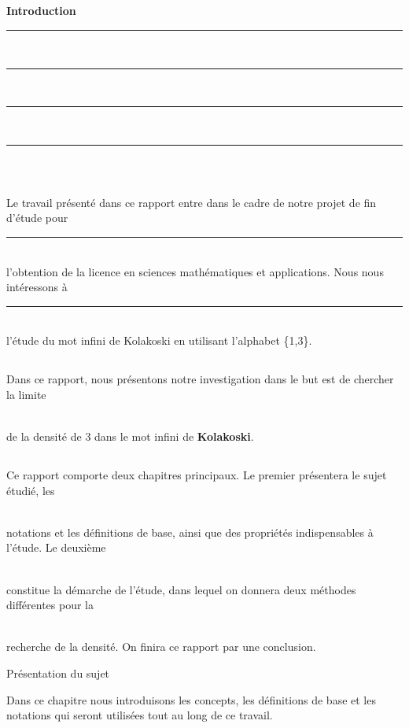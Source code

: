 \documentclass[12pt,a4paper,oneside]{book}
\begin{document}
\begin{titlepage}
\chapter*{}      
      \begin{center}
            {\Huge \textbf{Introduction}}
      \end{center}
\rule{1\textwidth}{0pt} \\\rule{1\textwidth}{0pt} \\\rule{1\textwidth}{0pt} \\\rule{1\textwidth}{0pt} \\
\section*{}
\par Le travail présenté dans ce rapport entre dans le cadre de notre projet de fin d'étude pour \\ \rule{1\textwidth}{0pt} \\ l'obtention de la licence en sciences mathématiques et applications. Nous nous intéressons à \\ \rule{1\textwidth}{0pt} \\ l'étude du mot infini de Kolakoski en utilisant l'alphabet \{1,3\}.
\section*{}
\par Dans ce rapport, nous présentons notre investigation dans le but est de chercher la limite  \\ \rule{0,3\textwidth}{0pt} \\ de la densité de 3 dans le mot infini de \textbf{Kolakoski}.
\section*{}
\par Ce rapport comporte deux chapitres principaux. Le premier présentera le sujet étudié, les \\ \rule{0,3\textwidth}{0pt} \\ notations et les définitions de base, ainsi que des propriétés indispensables à l'étude. Le deuxième \\ \rule{0,3\textwidth}{0pt} \\constitue la démarche de l'étude, dans lequel on donnera deux méthodes différentes pour la  \\ \rule{0,3\textwidth}{0pt} \\ recherche de la densité. On finira ce rapport par une conclusion.
\begin{chapter}{Présentation du sujet}
\par Dans ce chapitre nous introduisons les concepts, les définitions de base et les notations qui seront utilisées tout au long de ce travail.

\end{chapter}
\end{titlepage}
\end{document}
